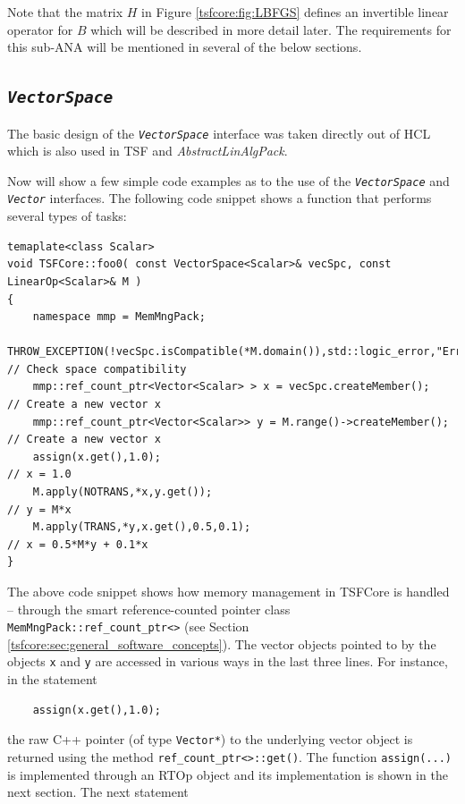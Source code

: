 \documentclass[10pt,fleqn]{article}
\begin{document}
Note that the matrix $H$ in Figure \ref{tsfcore:fig:LBFGS} defines an
invertible linear operator for $B$ which will be described in more
detail later.  The requirements for this sub-ANA will be mentioned in
several of the below sections.

%
\subsection{\texttt{\textit{VectorSpace}}}
\label{tsfcore:sec:vec_space}
%

The basic design of the \texttt{\textit{VectorSpace}} interface was
taken directly out of HCL which is also used in TSF and
\textit{AbstractLinAlgPack}.

Now will show a few simple code examples as to the use of the
\texttt{\textit{VectorSpace}} and
\texttt{\textit{Vector}} interfaces.  The following code snippet shows
a function that performs several types of tasks:

{\scriptsize\begin{verbatim}
temaplate<class Scalar>
void TSFCore::foo0( const VectorSpace<Scalar>& vecSpc, const LinearOp<Scalar>& M )
{
    namespace mmp = MemMngPack;
    THROW_EXCEPTION(!vecSpc.isCompatible(*M.domain()),std::logic_error,"Error!"); // Check space compatibility
    mmp::ref_count_ptr<Vector<Scalar> > x = vecSpc.createMember();                // Create a new vector x
    mmp::ref_count_ptr<Vector<Scalar>> y = M.range()->createMember();             // Create a new vector x
    assign(x.get(),1.0);                                                          // x = 1.0
    M.apply(NOTRANS,*x,y.get());                                                  // y = M*x
    M.apply(TRANS,*y,x.get(),0.5,0.1);                                            // x = 0.5*M*y + 0.1*x
}
\end{verbatim}}

The above code snippet shows how memory management in TSFCore is handled
-- through the smart reference-counted pointer class
\texttt{MemMngPack\-::ref\_count\_ptr<>} (see Section
\ref{tsfcore:sec:general_software_concepts}).  The vector objects pointed
to by the objects \texttt{x} and \texttt{y} are accessed in various
ways in the last three lines.  For instance, in the statement

{\scriptsize\begin{verbatim}
    assign(x.get(),1.0);
\end{verbatim}}

the raw C++ pointer (of type \texttt{Vector*}) to the underlying
vector object is returned using the method
\texttt{ref\_count\_ptr<>\-::get()}.  The function
\texttt{assign(...)} is implemented through an RTOp object and its
implementation is shown in the next section.  The next statement
\end{document}
